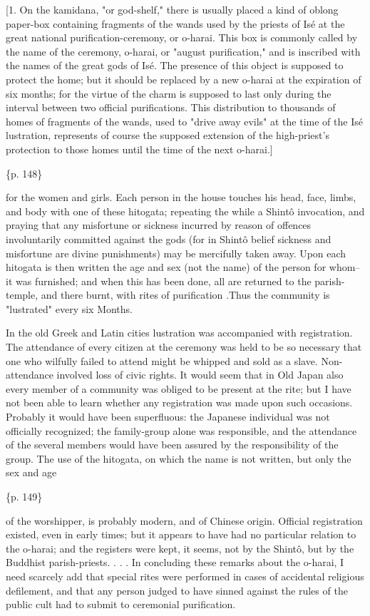 [1. On the kamidana, "or god-shelf," there is usually placed a kind of oblong paper-box containing fragments of the wands used by the priests of Isé at the great national purification-ceremony, or o-harai. This box is commonly called by the name of the ceremony, o-harai, or "august purification," and is inscribed with the names of the great gods of Isé. The presence of this object is supposed to protect the home; but it should be replaced by a new o-harai at the expiration of six months; for the virtue of the charm is supposed to last only during the interval between two official purifications. This distribution to thousands of homes of fragments of the wands, used to "drive away evils" at the time of the Isé lustration, represents of course the supposed extension of the high-priest's protection to those homes until the time of the next o-harai.]

\{p. 148\}

for the women and girls. Each person in the house touches his head, face, limbs, and body with one of these hitogata; repeating the while a Shintô invocation, and praying that any misfortune or sickness incurred by reason of offences involuntarily committed against the gods (for in Shintô belief sickness and misfortune are divine punishments) may be mercifully taken away. Upon each hitogata is then written the age and sex (not the name) of the person for whom--it was furnished; and when this has been done, all are returned to the parish-temple, and there burnt, with rites of purification .Thus the community is "lustrated" every six Months.

In the old Greek and Latin cities lustration was accompanied with registration. The attendance of every citizen at the ceremony was held to be so necessary that one who wilfully failed to attend might be whipped and sold as a slave. Non-attendance involved loss of civic rights. It would seem that in Old Japan also every member of a community was obliged to be present at the rite; but I have not been able to learn whether any registration was made upon such occasions. Probably it would have been superfluous: the Japanese individual was not officially recognized; the family-group alone was responsible, and the attendance of the several members would have been assured by the responsibility of the group. The use of the hitogata, on which the name is not written, but only the sex and age

\{p. 149\}

of the worshipper, is probably modern, and of Chinese origin. Official registration existed, even in early times; but it appears to have had no particular relation to the o-harai; and the registers were kept, it seems, not by the Shintô, but by the Buddhist parish-priests. . . . In concluding these remarks about the o-harai, I need scarcely add that special rites were performed in cases of accidental religious defilement, and that any person judged to have sinned against the rules of the public cult had to submit to ceremonial purification.



